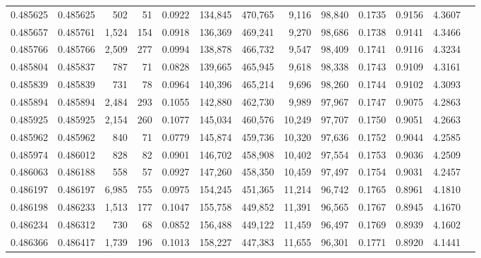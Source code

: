 \begin{tabular}{rrrrrrrrrrrrr}
0.485625 & 0.485625 &   502 &    51 &                                     0.0922 & 134,845 & 470,765 &   9,116 &  98,840 & 0.1735 & 0.9156 & 4.3607 \\
0.485657 & 0.485761 & 1,524 &   154 &                                     0.0918 & 136,369 & 469,241 &   9,270 &  98,686 & 0.1738 & 0.9141 & 4.3466 \\
0.485766 & 0.485766 & 2,509 &   277 &                                     0.0994 & 138,878 & 466,732 &   9,547 &  98,409 & 0.1741 & 0.9116 & 4.3234 \\
0.485804 & 0.485837 &   787 &    71 &                                     0.0828 & 139,665 & 465,945 &   9,618 &  98,338 & 0.1743 & 0.9109 & 4.3161 \\
0.485839 & 0.485839 &   731 &    78 &                                     0.0964 & 140,396 & 465,214 &   9,696 &  98,260 & 0.1744 & 0.9102 & 4.3093 \\
0.485894 & 0.485894 & 2,484 &   293 &                                     0.1055 & 142,880 & 462,730 &   9,989 &  97,967 & 0.1747 & 0.9075 & 4.2863 \\
0.485925 & 0.485925 & 2,154 &   260 &                                     0.1077 & 145,034 & 460,576 &  10,249 &  97,707 & 0.1750 & 0.9051 & 4.2663 \\
0.485962 & 0.485962 &   840 &    71 &                                     0.0779 & 145,874 & 459,736 &  10,320 &  97,636 & 0.1752 & 0.9044 & 4.2585 \\
0.485974 & 0.486012 &   828 &    82 &                                     0.0901 & 146,702 & 458,908 &  10,402 &  97,554 & 0.1753 & 0.9036 & 4.2509 \\
0.486063 & 0.486188 &   558 &    57 &                                     0.0927 & 147,260 & 458,350 &  10,459 &  97,497 & 0.1754 & 0.9031 & 4.2457 \\
0.486197 & 0.486197 & 6,985 &   755 &                                     0.0975 & 154,245 & 451,365 &  11,214 &  96,742 & 0.1765 & 0.8961 & 4.1810 \\
0.486198 & 0.486233 & 1,513 &   177 &                                     0.1047 & 155,758 & 449,852 &  11,391 &  96,565 & 0.1767 & 0.8945 & 4.1670 \\
0.486234 & 0.486312 &   730 &    68 &                                     0.0852 & 156,488 & 449,122 &  11,459 &  96,497 & 0.1769 & 0.8939 & 4.1602 \\
0.486366 & 0.486417 & 1,739 &   196 &                                     0.1013 & 158,227 & 447,383 &  11,655 &  96,301 & 0.1771 & 0.8920 & 4.1441 \\

\end{tabular}
